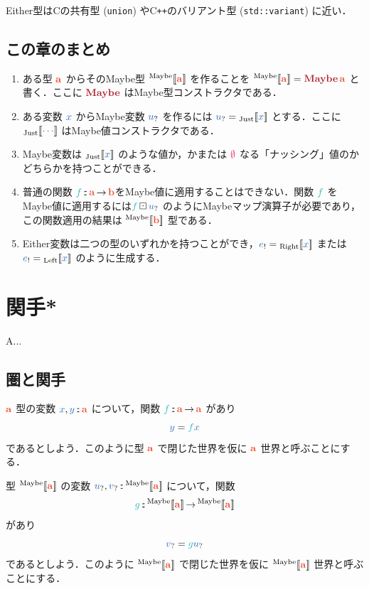 \documentclass[a5paper,twoside,fleqn,draft]{jsbook}
\def\[{[\![}
\def\]{]\!]}
\def\constantColor{WildStrawberry}
\def\varColor{NavyBlue}
\def\funcColor{BlueGreen}
\def\typeColor{RedOrange}
\def\typeConstColor{Maroon}
\newcommand{\programminglanguage}[1]{\textsf{#1}}
\newcommand{\clang}{\programminglanguage{C}}
\newcommand{\cxx}{\programminglanguage{C}\texttt{++}}
\newenvironment{leader}{\begingroup\gt}{\endgroup}
\newcommand{\code}[1]{\texttt{#1}}
\newcommand{\mSpecialTypeConstructor}[1]{\textcolor{\typeConstColor}{\textbf{#1}}}
\newcommand{\mNothing}{\textcolor{\constantColor}{\emptyset}}
\newcommand{\mVar}[1]{\textcolor{\varColor}{#1}}
\newcommand{\mXVar}{\mVar{x}}
\newcommand{\mYVar}{\mVar{y}}
\newcommand{\mFunc}[1]{\textcolor{\funcColor}{#1}}
\newcommand{\mFFunc}{{\mFunc{f}}}
\newcommand{\mGFunc}{\mFunc{g}}
\DeclareMathOperator{\mFuncArrow}{\rightarrow}
\DeclareMathOperator{\mIn}{{:\!:}}
\DeclareMathOperator{\mMapMaybe}{\boxdot}
\newcommand{\mType}[1]{\textcolor{\typeColor}{\mathbf{#1}}}
\newcommand{\mA}{\mType{a}}
\newcommand{\mB}{\mType{b}}
\newcommand{\mTypeAssemble}[2]{{}^\mathrm{#1}\[\mType{#2}\]}
\newcommand{\mMaybeType}[1]{\mTypeAssemble{Maybe}{#1}}
\DeclareMathOperator{\mMaybeTypeConstructor}{\mSpecialTypeConstructor{Maybe}}
\newcommand{\mValueConstructor}[1]{\mathrm{#1}}
\newcommand{\mValueWith}[2]{{}_\mValueConstructor{#1}\[\mVar{#2}\]}
\newcommand{\mLeftWith}[1]{\mValueWith{Left}{#1}}
\newcommand{\mRightWith}[1]{\mValueWith{Right}{#1}}
\newcommand{\mJustWith}[1]{\mValueWith{Just}{#1}}
\newcommand{\mEither}[1]{\mVar{#1}_!}
\newcommand{\mMaybe}[1]{\mVar{#1}_?}
\newcommand{\mProjEXP}[2]{#1\mFuncArrow#2} %
\begin{document}
Either型は\clang の共有型 (\code{union}) や\cxx のバリアント型 (\code{std::variant}) に近い．

\section{この章のまとめ}

\begin{enumerate}
\item ある型 $\mA $ からそのMaybe型 $\mMaybeType{a}$ を作ることを $\mMaybeType{a}=\mMaybeTypeConstructor\mA $ と書く．ここに $\mMaybeTypeConstructor$ はMaybe型コンストラクタである．
\item ある変数 $\mXVar$ からMaybe変数 $\mMaybe{u}$ を作るには $\mMaybe{u}=\mJustWith{x}$ とする．ここに $\mJustWith{\dotsb}$ はMaybe値コンストラクタである．
\item Maybe変数は $\mJustWith{x}$ のような値か，かまたは $\mNothing$ なる「ナッシング」値のかどちらかを持つことができる．
\item 普通の関数 $\mFFunc\mIn\mProjEXP{\mA }{\mB }$をMaybe値に適用することはできない．関数 $\mFFunc$ をMaybe値に適用するには$\mFFunc\mMapMaybe\mMaybe{u}$ のようにMaybeマップ演算子が必要であり，この関数適用の結果は $\mMaybeType{b}$ 型である．
\item Either変数は二つの型のいずれかを持つことができ，$\mEither{e}=\mRightWith{x}$ または$\mEither{e}=\mLeftWith{x}$ のように生成する．
\end{enumerate}

\chapter{関手*}
\label{ch:functor}

\begin{leader}
A...
\end{leader}

\section{圏と関手}

$\mA $ 型の変数 $\mXVar,\mYVar\mIn\mA$ について，関数 $\mFFunc\mIn\mA\mFuncArrow\mA$ があり
\begin{equation}
  \mYVar
  =\mFFunc\mXVar
\end{equation}
であるとしよう．このように型 $\mA$ で閉じた世界を仮に $\mA$ 世界と呼ぶことにする．

型 $\mMaybeType{a}$ の変数 $\mMaybe{u},\mMaybe{v}\mIn\mMaybeType{a}$ について，関数
\begin{equation}
  \mGFunc
  \mIn\mMaybeType{a}\mFuncArrow\mMaybeType{a}
\end{equation}
があり
\begin{equation}
  \mMaybe{v}
  =\mGFunc\mMaybe{u}
\end{equation}
であるとしよう．このように $\mMaybeType{a}$ で閉じた世界を仮に $\mMaybeType{a}$ 世界と呼ぶことにする．
\end{document}
